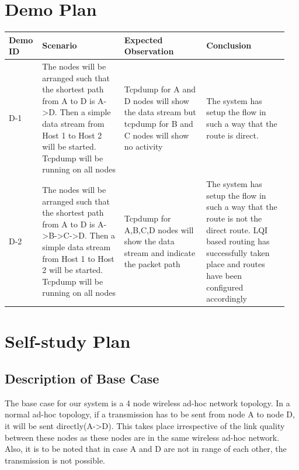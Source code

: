 \documentclass{article}
\begin{document}
\section{Demo Plan}
{\renewcommand{\arraystretch}{1.5}
\begin{tabular}{ | p{0.095\linewidth} | p{0.285\linewidth} | p{0.285\linewidth} | p{0.285\linewidth} | }
\hline
\textbf{Demo ID}	&	\textbf{Scenario}	&	\textbf{Expected Observation}	&	\textbf{Conclusion}	\\ 
\hline \hline
D-1 & The nodes will be arranged such that the shortest path from A to D is A-\textgreater D. Then a simple data stream from Host 1
to Host 2 will be started. Tcpdump will be running on all nodes & Tcpdump for A and D nodes will show the data stream
but tcpdump for B and C nodes will show no activity & The system has setup the flow in such a way that the route is
direct. \\
\hline
D-2 & The nodes will be arranged such that the shortest path from A to D is A-\textgreater B-\textgreater C-\textgreater D. Then a simple data stream from
Host 1 to Host 2 will be started. Tcpdump will be running on all nodes & Tcpdump for A,B,C,D nodes will show the data
stream and indicate the packet path & The system has setup the flow in such a way that the route is not the direct
route. LQI based routing has successfully taken place and routes have been configured accordingly \\
\hline
\end{tabular}}
\section{Self-study Plan}
\subsection{Description of Base Case}
The base case for our system is a 4 node wireless ad-hoc network topology. In a normal ad-hoc topology, if a
transmission has to be sent from node A to node D, it will be sent directly(A-\textgreater D). This takes place irrespective of the
link quality between these nodes as these nodes are in the same wireless ad-hoc network. Also, it is to be noted that in
case A and D are not in range of each other, the transmission is not possible.
\end{document}
